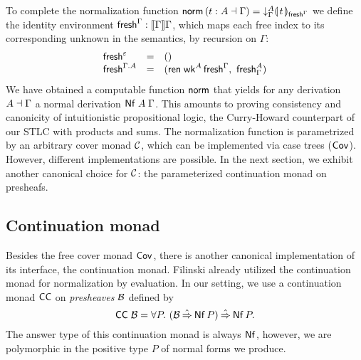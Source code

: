 \documentclass[sigplan,screen,fleqn,review]{acmart} %
\begin{document}
To complete the normalization function
$\mathsf{norm}\,(t : A \dashv \Gamma) = \mathord{\downarrow_{\Gamma}^{A}} \llparenthesis\kern0.3ext\kern0.3ex\rrparenthesis_{\mathsf{fresh}^{\Gamma}}$
we define the identity environment $\mathsf{fresh}^{\Gamma} : \mathopen{{[\kern-0.14em[}} \Gamma \mathclose{{]\kern-0.14em]}} \Gamma$,
which maps each free index to its corresponding unknown in the
semantics, by recursion on $\Gamma$:
\[
\begin{array}{lcl}
  \mathsf{fresh}^{\varepsilon} & = & () \\
  \mathsf{fresh}^{\Gamma.A} & = & (\mathsf{ren}\;\mathsf{wk}^A\,\mathsf{fresh}^{\Gamma}, \  \mathsf{fresh}^A_\Gamma)\\
\end{array}
\]
We have obtained a computable function $\mathsf{norm}$ that yields for any
derivation $A \dashv \Gamma$ a normal derivation $\mathsf{Nf}\;A\;\Gamma$.
This amounts to proving
consistency and canonicity of intuitionistic propositional logic, the
Curry-Howard counterpart of our STLC with products and sums.
The normalization function is parametrized by an arbitrary cover monad
$\mathcal{C}$, which can be implemented via case trees ($\mathsf{Cov}^{}$).  However,
different implementations are possible.  In the next section, we exhibit
another canonical choice for $\mathcal{C}$: the parameterized continuation monad on presheafs.

\subsection{Continuation monad}

Besides the free cover monad $\mathsf{Cov}^{}$, there is another canonical
implementation of its interface, the continuation monad.
Filinski
\cite[Section~5.4]{filinski:semaccounttdpe}
\cite[Section~3.2]{filinski:tlca01}
already utilized the continuation monad for
normalization by evaluation.
In our setting, we use a continuation monad $\mathsf{CC}$ on \emph{presheaves}
$\mathcal{B}$ defined by
\[
  \CC\;\B = \forall P.\ (\B \hatto \tNf\,P) \hatto \tNf\,P
  .
\]
The answer type of this continuation monad is always $\mathsf{Nf}$, however,
we are polymorphic in the positive type $P$ of normal forms we produce.%
\end{document}
